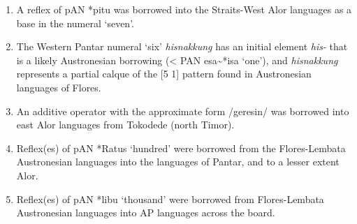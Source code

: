 \begin{enumerate}
\item A reflex of pAN *pitu was borrowed into the Straits-West Alor languages as a base in the numeral `seven'. 

\item The Western Pantar numeral `six' \textit{hisnakkung} has an initial element \textit{his-} that is a likely Austronesian borrowing ({\textless} PAN esa\~{}*isa `one'), and \textit{hisnakkung} represents a partial calque of the [5 1] pattern found in Austronesian languages of Flores. 

\item An additive operator with the approximate form /geresin/ was borrowed into east Alor languages from Tokodede (north Timor). 

\item Reflex(es) of pAN *Ratus `hundred' were borrowed from the Flores-Lembata Austronesian languages into the languages of Pantar, and to a lesser extent Alor.

\item Reflex(es) of pAN *libu `thousand' were borrowed from Flores-Lembata Austronesian languages into AP languages across the board.  


\end{enumerate}
